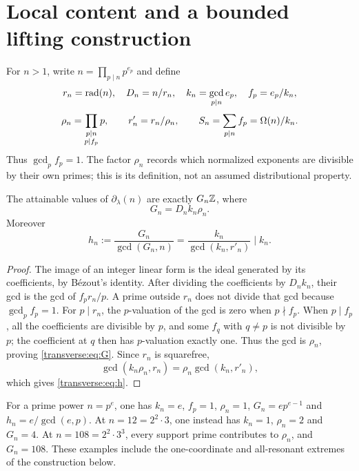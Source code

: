 \section{Local content and a bounded lifting construction}\label{transverse:sec:local}
For $n>1$, write $n=\prod_{p\mid n}p^{e_p}$ and define
\[
 r_n=\operatorname{rad}(n),\quad D_n=n/r_n,\quad
 k_n=\gcd_{p\mid n}e_p,\quad f_p=e_p/k_n,
\]
\begin{equation}\label{transverse:eq:rho}
 \rho_n=\prod_{\substack{p\mid n\\p\mid f_p}}p,
 \qquad r'_n=r_n/\rho_n,\qquad S_n=\sum_{p\mid n}f_p=\Omega(n)/k_n.
\end{equation}
Thus $\gcd_p f_p=1$. The factor $\rho_n$ records which normalized exponents are divisible by their own primes; this is its definition, not an assumed distributional property.

\begin{lemma}\label{transverse:lem:content}
The attainable values of $\partial_\lambda(n)$ are exactly $G_n\mathbb Z$, where
\begin{equation}\label{transverse:eq:G}
 G_n=D_n k_n\rho_n.
\end{equation}
Moreover
\begin{equation}\label{transverse:eq:h}
 h_n:=\frac{G_n}{\gcd(G_n,n)}
 =\frac{k_n}{\gcd(k_n,r'_n)}\mid k_n.
\end{equation}
\end{lemma}
\begin{proof}
The image of an integer linear form is the ideal generated by its coefficients, by B\'ezout's identity. After dividing the coefficients by $D_nk_n$, their gcd is the gcd of $f_p r_n/p$. A prime outside $r_n$ does not divide that gcd because $\gcd_p f_p=1$. For $p\mid r_n$, the $p$-valuation of the gcd is zero when $p\nmid f_p$. When $p\mid f_p$, all the coefficients are divisible by $p$, and some $f_q$ with $q\ne p$ is not divisible by $p$; the coefficient at $q$ then has $p$-valuation exactly one. Thus the gcd is $\rho_n$, proving \eqref{transverse:eq:G}. Since $r_n$ is squarefree,
\[
 \gcd(k_n\rho_n,r_n)=\rho_n\gcd(k_n,r'_n),
\]
which gives \eqref{transverse:eq:h}.
\end{proof}
For a prime power $n=p^e$, one has $k_n=e$, $f_p=1$, $\rho_n=1$, $G_n=ep^{e-1}$ and $h_n=e/\gcd(e,p)$. At $n=12=2^2\cdot3$, one instead has $k_n=1$, $\rho_n=2$ and $G_n=4$. At $n=108=2^2\cdot3^3$, every support prime contributes to $\rho_n$, and $G_n=108$. These examples include the one-coordinate and all-resonant extremes of the construction below.

